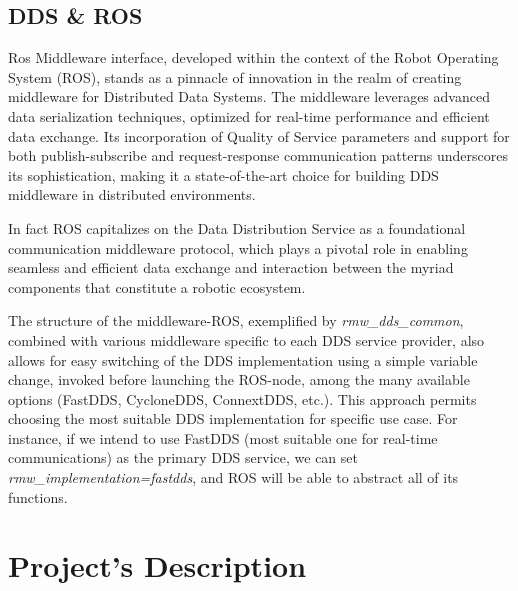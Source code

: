 \subsection{DDS \& ROS}\label{SSEC:rosiface}

Ros Middleware interface\cite{ros2iface}, developed within the context of the Robot Operating System (ROS), stands as a pinnacle of innovation in the realm of creating middleware for Distributed Data Systems. The middleware leverages advanced data serialization techniques, optimized for real-time performance and efficient data exchange. Its incorporation of Quality of Service parameters and support for both publish-subscribe and request-response communication patterns underscores its sophistication, making it a state-of-the-art choice for building DDS middleware in distributed environments.

In fact ROS capitalizes on the Data Distribution Service as a foundational communication middleware protocol\cite{ros2iron}, which plays a pivotal role in enabling seamless and efficient data exchange and interaction between the myriad components that constitute a robotic ecosystem.

The structure of the middleware-ROS, exemplified by \emph{rmw\_dds\_common}\cite{ros2iron}, combined with various middleware specific to each DDS service provider, also allows for easy switching of the DDS implementation using a simple variable change, invoked before launching the ROS-node, among the many available options (FastDDS, CycloneDDS, ConnextDDS, etc.). 
This approach permits choosing the most suitable DDS implementation for specific use case. For instance, if we intend to use FastDDS (most suitable one for real-time communications) as the primary DDS service, we can set \emph{rmw\_implementation=fastdds}, and ROS will be able to abstract all of its functions.

\section{Project's Description}\label{SEC:pd}

